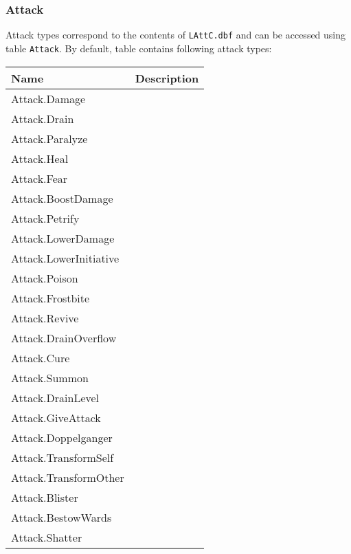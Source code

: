 \subsubsection{Attack}
\label{AttackCategory}
Attack types correspond to the contents of \texttt{LAttC.dbf} and can be accessed using table \texttt{Attack}.
By default, table contains following attack types:\\
\begin{tabularx}{\linewidth}{| l | X |}
\hline
\textbf{Name} & \textbf{Description} \\
\hline
Attack.Damage &\\
\hline
Attack.Drain &\\
\hline
Attack.Paralyze &\\
\hline
Attack.Heal &\\
\hline
Attack.Fear &\\
\hline
Attack.BoostDamage &\\
\hline
Attack.Petrify &\\
\hline
Attack.LowerDamage &\\
\hline
Attack.LowerInitiative &\\
\hline
Attack.Poison &\\
\hline
Attack.Frostbite &\\
\hline
Attack.Revive &\\
\hline
Attack.DrainOverflow &\\
\hline
Attack.Cure &\\
\hline
Attack.Summon &\\
\hline
Attack.DrainLevel &\\
\hline
Attack.GiveAttack &\\
\hline
Attack.Doppelganger &\\
\hline
Attack.TransformSelf &\\
\hline
Attack.TransformOther &\\
\hline
Attack.Blister &\\
\hline
Attack.BestowWards &\\
\hline
Attack.Shatter &\\
\hline
\end{tabularx}

